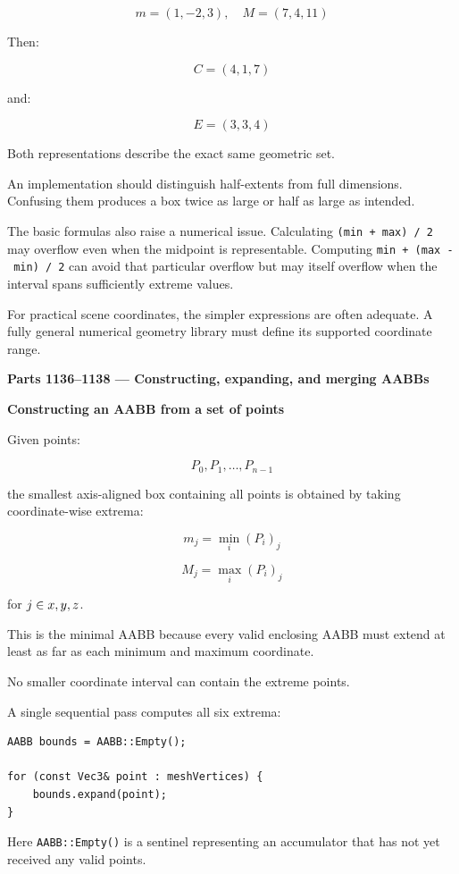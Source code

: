 \[
m=(1,-2,3),\quad M=(7,4,11)
\]

Then:

\[
C=(4,1,7)
\]

and:

\[
E=(3,3,4)
\]

Both representations describe the exact same geometric set.

An implementation should distinguish half-extents from full dimensions. Confusing them produces a box twice as large or half as large as intended.

The basic formulas also raise a numerical issue. Calculating \texttt{(min\ +\ max)\ /\ 2} may overflow even when the midpoint is representable. Computing \texttt{min\ +\ (max\ -\ min)\ /\ 2} can avoid that particular overflow but may itself overflow when the interval spans sufficiently extreme values.

For practical scene coordinates, the simpler expressions are often adequate. A fully general numerical geometry library must define its supported coordinate range.

\textbf{Parts 1136--1138 --- Constructing, expanding, and merging AABBs}

\textbf{Constructing an AABB from a set of points}

Given points:

\[
P_0,P_1,\ldots,P_{n-1}
\]

the smallest axis-aligned box containing all points is obtained by taking coordinate-wise extrema:

\[
\boxed{ m_j=\min_i(P_i)_j }
\]

\[
\boxed{ M_j=\max_i(P_i)_j }
\]

for \(j\in\\{x,y,z\\}\).

This is the minimal AABB because every valid enclosing AABB must extend at least as far as each minimum and maximum coordinate.

No smaller coordinate interval can contain the extreme points.

A single sequential pass computes all six extrema:

\begin{verbatim}
AABB bounds = AABB::Empty();

for (const Vec3& point : meshVertices) {
    bounds.expand(point);
}
\end{verbatim}

Here \texttt{AABB::Empty()} is a sentinel representing an accumulator that has not yet received any valid points.

